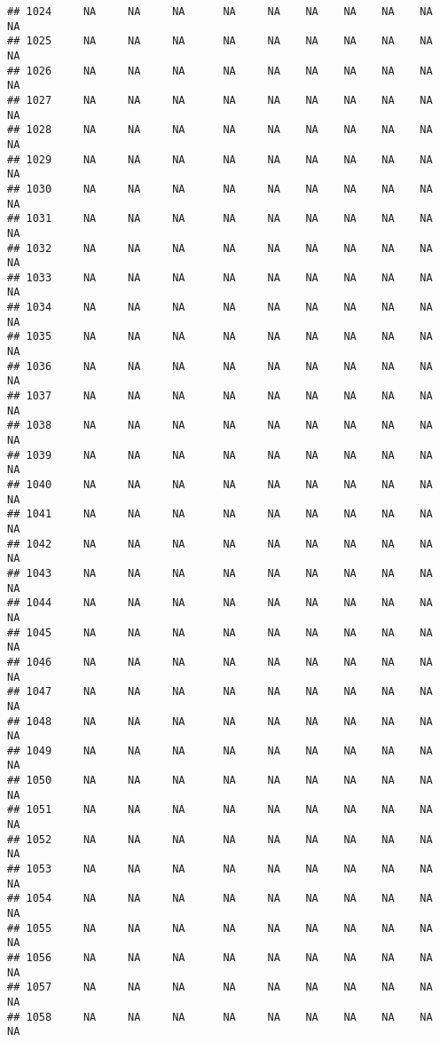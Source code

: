 \documentclass{article}\usepackage{graphicx, color}
\makeatletter
\newenvironment{kframe}{%
 \def\at@end@of@kframe{}%
 \ifinner\ifhmode%
  \def\at@end@of@kframe{\end{minipage}}%
  \begin{minipage}{\columnwidth}%
 \fi\fi%
 \def\FrameCommand##1{\hskip\@totalleftmargin \hskip-\fboxsep
 \colorbox{shadecolor}{##1}\hskip-\fboxsep
     \hskip-\linewidth \hskip-\@totalleftmargin \hskip\columnwidth}%
 \MakeFramed {\advance\hsize-\width
   \@totalleftmargin\z@ \linewidth\hsize
   \@setminipage}}%
 {\par\unskip\endMakeFramed%
 \at@end@of@kframe}
\newenvironment{knitrout}{}{} %
\makeatother
\begin{document}
\begin{knitrout}
\begin{kframe}
\begin{verbatim}
## 1024     NA     NA     NA      NA     NA    NA    NA    NA    NA     NA
## 1025     NA     NA     NA      NA     NA    NA    NA    NA    NA     NA
## 1026     NA     NA     NA      NA     NA    NA    NA    NA    NA     NA
## 1027     NA     NA     NA      NA     NA    NA    NA    NA    NA     NA
## 1028     NA     NA     NA      NA     NA    NA    NA    NA    NA     NA
## 1029     NA     NA     NA      NA     NA    NA    NA    NA    NA     NA
## 1030     NA     NA     NA      NA     NA    NA    NA    NA    NA     NA
## 1031     NA     NA     NA      NA     NA    NA    NA    NA    NA     NA
## 1032     NA     NA     NA      NA     NA    NA    NA    NA    NA     NA
## 1033     NA     NA     NA      NA     NA    NA    NA    NA    NA     NA
## 1034     NA     NA     NA      NA     NA    NA    NA    NA    NA     NA
## 1035     NA     NA     NA      NA     NA    NA    NA    NA    NA     NA
## 1036     NA     NA     NA      NA     NA    NA    NA    NA    NA     NA
## 1037     NA     NA     NA      NA     NA    NA    NA    NA    NA     NA
## 1038     NA     NA     NA      NA     NA    NA    NA    NA    NA     NA
## 1039     NA     NA     NA      NA     NA    NA    NA    NA    NA     NA
## 1040     NA     NA     NA      NA     NA    NA    NA    NA    NA     NA
## 1041     NA     NA     NA      NA     NA    NA    NA    NA    NA     NA
## 1042     NA     NA     NA      NA     NA    NA    NA    NA    NA     NA
## 1043     NA     NA     NA      NA     NA    NA    NA    NA    NA     NA
## 1044     NA     NA     NA      NA     NA    NA    NA    NA    NA     NA
## 1045     NA     NA     NA      NA     NA    NA    NA    NA    NA     NA
## 1046     NA     NA     NA      NA     NA    NA    NA    NA    NA     NA
## 1047     NA     NA     NA      NA     NA    NA    NA    NA    NA     NA
## 1048     NA     NA     NA      NA     NA    NA    NA    NA    NA     NA
## 1049     NA     NA     NA      NA     NA    NA    NA    NA    NA     NA
## 1050     NA     NA     NA      NA     NA    NA    NA    NA    NA     NA
## 1051     NA     NA     NA      NA     NA    NA    NA    NA    NA     NA
## 1052     NA     NA     NA      NA     NA    NA    NA    NA    NA     NA
## 1053     NA     NA     NA      NA     NA    NA    NA    NA    NA     NA
## 1054     NA     NA     NA      NA     NA    NA    NA    NA    NA     NA
## 1055     NA     NA     NA      NA     NA    NA    NA    NA    NA     NA
## 1056     NA     NA     NA      NA     NA    NA    NA    NA    NA     NA
## 1057     NA     NA     NA      NA     NA    NA    NA    NA    NA     NA
## 1058     NA     NA     NA      NA     NA    NA    NA    NA    NA     NA

\end{verbatim}
\end{kframe}
\end{knitrout}
\end{document}
